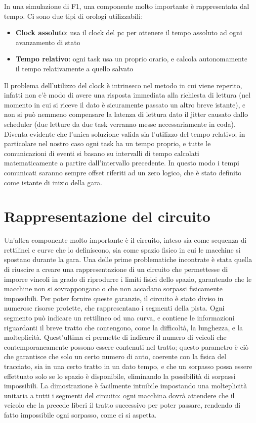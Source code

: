 In una simulazione di F1, una componente molto importante è rappresentata dal tempo. Ci sono due tipi di orologi utilizzabili:
\begin{itemize}
 \item \textbf{Clock assoluto}: usa il clock del pc per ottenere il tempo assoluto ad ogni avanzamento di stato
 \item \textbf{Tempo relativo}: ogni task usa un proprio orario, e calcola autonomamente il tempo relativamente a quello salvato
\end{itemize}
Il problema dell’utilizzo del clock è intrinseco nel metodo in cui viene reperito, infatti non c’è modo di avere una risposta immediata alla richiesta di lettura (nel momento in cui si riceve il dato è sicuramente passato un altro breve istante), e non si può nemmeno compensare la latenza di lettura dato il jitter causato dallo scheduler (due letture da due task verranno messe necessariamente in coda).
Diventa evidente che l’unica soluzione valida sia l’utilizzo del tempo relativo; in particolare nel nostro caso ogni task ha un tempo proprio, e tutte le comunicazioni di eventi si basano su intervalli di tempo calcolati matematicamente a partire dall’intervallo precedente. In questo modo i tempi comunicati saranno sempre offset riferiti ad un zero logico, che è stato definito come istante di inizio della gara.


\section{Rappresentazione del circuito}
Un’altra componente molto importante è il circuito, inteso sia come sequenza di rettilinei e curve che lo definiscono, sia come spazio fisico in cui le macchine si spostano durante la gara. Una delle prime problematiche incontrate è stata quella di riuscire a creare una rappresentazione di un circuito che permettesse di imporre vincoli in grado di riprodurre i limiti fisici dello spazio, garantendo che le macchine non si sovrappongano o che non accadano sorpassi fisicamente impossibili. 
Per poter fornire queste garanzie, il circuito è stato diviso in numerose risorse protette, che rappresentano i segmenti della pista. Ogni segmento può indicare un rettilineo od una curva, e contiene le informazioni riguardanti il breve tratto che contengono, come la difficoltà, la lunghezza, e la molteplicità. Quest’ultima ci permette di indicare il numero di veicoli che contemporaneamente possono essere contenuti nel tratto; questo parametro è ciò che garantisce che solo un certo numero di auto, coerente con la fisica del tracciato, sia in una certo tratto in un dato tempo, e che un sorpasso possa essere effettuato solo se lo spazio è disponibile, eliminando la possibilità di sorpassi impossibili. La dimostrazione è facilmente intuibile impostando una molteplicità unitaria a tutti i segmenti del circuito: ogni macchina dovrà attendere che il veicolo che la precede liberi il tratto successivo per poter passare, rendendo di fatto impossibile ogni sorpasso, come ci si aspetta.

